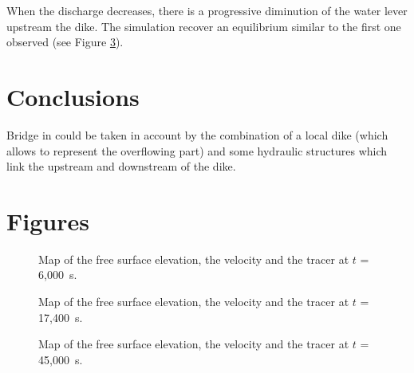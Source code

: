 When the discharge decreases, there is a progressive diminution of the water
lever upstream the dike.
The simulation recover an equilibrium similar to the first one observed
(see Figure \ref{fig:bridge:surf2}).

\section{Conclusions}

Bridge in  could be taken in account by the combination of a local
dike (which allows to represent the overflowing part) and some hydraulic
structures which link the upstream and downstream of the dike.

\section{Figures}

\begin{figure}
\centering
 \caption{Map of the free surface elevation, the velocity and the tracer at $t$ = 6,000~s.}\label{fig:bridge:surf0}
\end{figure}

\begin{figure}
\centering
 \caption{Map of the free surface elevation, the velocity and the tracer at $t$ = 17,400~s.}\label{fig:bridge:surf1}
\end{figure}

\begin{figure}
\centering
 \caption{Map of the free surface elevation, the velocity and the tracer at $t$ = 45,000~s.}\label{fig:bridge:surf2}
\end{figure}
